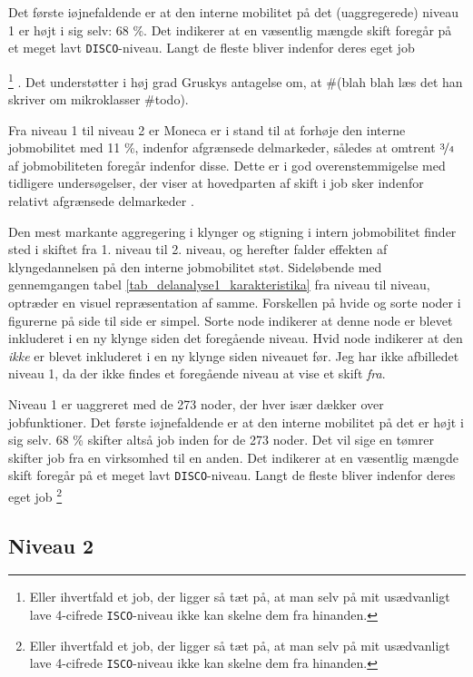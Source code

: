 Det første iøjnefaldende er at den interne mobilitet på det (uaggregerede) niveau 1 er højt i sig selv: 68 \%. Det indikerer at en væsentlig mængde skift foregår på et meget lavt \texttt{DISCO}-niveau. Langt de fleste bliver indenfor deres eget job%
%

\footnote{Eller ihvertfald et job, der ligger så tæt på, at man selv på mit usædvanligt lave 4-cifrede \texttt{ISCO}-niveau ikke kan skelne dem fra hinanden.}%
%
. Det understøtter i høj grad Gruskys antagelse om, at #(blah blah læs det han skriver om mikroklasser \#todo). 


Fra niveau 1 til niveau 2 er Moneca er i stand til at forhøje den interne jobmobilitet med 11 \%, indenfor afgrænsede delmarkeder, således at omtrent $\nicefrac{3}{4}$ af jobmobiliteten foregår indenfor disse. Dette er i god overenstemmigelse med tidligere undersøgelser, der viser at hovedparten af skift i job sker indenfor relativt afgrænsede delmarkeder \parencite[124]{BojeToft1989}. 


Den mest markante aggregering i klynger og stigning i intern jobmobilitet finder sted i skiftet fra 1. niveau til 2. niveau, og herefter falder effekten af klyngedannelsen på den interne jobmobilitet støt. Sideløbende med gennemgangen tabel \ref{tab_delanalyse1_karakteristika} fra niveau til niveau, optræder en visuel repræsentation af samme. Forskellen på hvide og sorte noder i figurerne på side \pageref{fig_delanalyse1_kort_seg_proces2} til side \pageref{fig_delanalyse1_kort_seg_proces5} er simpel. Sorte node indikerer at denne node er blevet inkluderet i en ny klynge siden det foregående niveau. Hvid node indikerer at den \emph{ikke} er blevet inkluderet i en ny klynge siden niveauet før. 
Jeg har ikke afbilledet niveau 1, da der ikke findes et foregående niveau at vise et skift \emph{fra}. 


Niveau 1 er uaggreret med de 273 noder, der hver især dækker over jobfunktioner. Det første iøjnefaldende er at den interne mobilitet på det er højt i sig selv. 68 \% skifter altså job inden for de 273 noder. Det vil sige en tømrer skifter job fra en virksomhed til en anden. Det indikerer at en væsentlig mængde skift foregår på et meget lavt \texttt{DISCO}-niveau. Langt de fleste bliver indenfor deres eget job%
%
\footnote{Eller ihvertfald et job, der ligger så tæt på, at man selv på mit usædvanligt lave 4-cifrede \texttt{ISCO}-niveau ikke kan skelne dem fra hinanden.}%
%


\newpage \subsection{Niveau 2}


